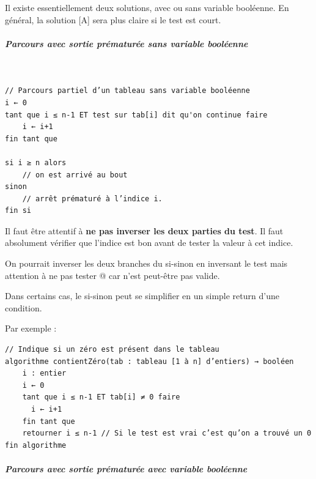 \documentclass[11pt,a4paper]{article}
\begin{document}
            \par
        
        Il existe essentiellement deux solutions, avec ou sans variable bool\'eenne. En g\'en\'eral, la
        solution [A] sera plus claire si le test est court.
		  
            \par
        
			
		\subparagraph{Parcours avec sortie pr\'ematur\'ee sans variable bool\'eenne} 
		
					\textcolor{white}{.} \par
				
            \par
        \begin{verbatim}
// Parcours partiel d’un tableau sans variable booléenne
i ← 0
tant que i ≤ n-1 ET test sur tab[i] dit qu'on continue faire
    i ← i+1
fin tant que

si i ≥ n alors
    // on est arrivé au bout
sinon
    // arrêt prématuré à l’indice i.
fin si
      \end{verbatim}
        Il faut \^etre attentif \`a \textbf{ne pas inverser les deux parties du test}. 
        Il faut absolument v\'erifier  que l'indice est bon avant de tester la valeur \`a cet indice.
      
            \par
        
        On pourrait inverser les deux branches du si-sinon en inversant le test mais attention \`a ne
        pas tester \verb@tab[i]@ car \verb@i@ n'est peut-\^etre pas valide.
      
            \par
        
        Dans certains cas, le si-sinon peut se simplifier en un simple return d'une condition.
      
            \par
        Par exemple : 
            \par
        \begin{verbatim}
// Indique si un zéro est présent dans le tableau
algorithme contientZéro(tab : tableau [1 à n] d’entiers) → booléen
    i : entier
    i ← 0
    tant que i ≤ n-1 ET tab[i] ≠ 0 faire
      i ← i+1
    fin tant que
    retourner i ≤ n-1 // Si le test est vrai c’est qu’on a trouvé un 0
fin algorithme
      \end{verbatim}
			
		\subparagraph{Parcours avec sortie pr\'ematur\'ee avec variable bool\'eenne} 
		
\end{document}
